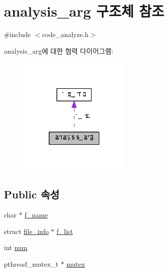 \hypertarget{structanalysis__arg}{\section{analysis\+\_\+arg 구조체 참조}
\label{structanalysis__arg}
}


{\ttfamily \#include $<$code\+\_\+analyze.\+h$>$}



analysis\+\_\+arg에 대한 협력 다이어그램\+:
\nopagebreak
\begin{figure}[H]
\begin{center}
\leavevmode
\includegraphics[width=157pt]{structanalysis__arg__coll__graph}
\end{center}
\end{figure}
\subsection*{Public 속성}
\begin{DoxyCompactItemize}
\item 
char $\ast$ \hyperlink{structanalysis__arg_ae4dc80fc7340c819c3315324b1c24511}{f\+\_\+name}
\item 
struct \hyperlink{structfile__info}{file\+\_\+info} $\ast$ \hyperlink{structanalysis__arg_a06dce9c50b6212f9fd620d149adc5734}{f\+\_\+list}
\item 
int \hyperlink{structanalysis__arg_af120d208cb66f64281db9ccd6f2f6afc}{num}
\item 
pthread\+\_\+mutex\+\_\+t $\ast$ \hyperlink{structanalysis__arg_a5af66e583b346de25aee6ab4acaa91a7}{mutex}
\end{DoxyCompactItemize}


